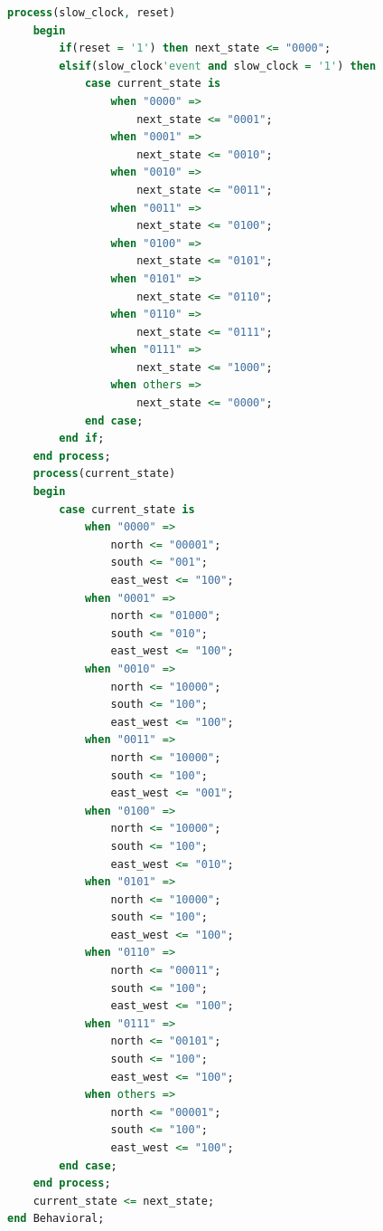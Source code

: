 \documentclass[11pt]{article}
\begin{document}
\begin{appendices}
\begin{lstlisting}[language=VHDL]
    process(slow_clock, reset)
    begin
        if(reset = '1') then next_state <= "0000";
        elsif(slow_clock'event and slow_clock = '1') then
            case current_state is
                when "0000" =>
                    next_state <= "0001";
                when "0001" =>
                    next_state <= "0010";
                when "0010" =>
                    next_state <= "0011";
                when "0011" =>
                    next_state <= "0100";
                when "0100" =>
                    next_state <= "0101";
                when "0101" =>
                    next_state <= "0110";
                when "0110" =>
                    next_state <= "0111";
                when "0111" =>
                    next_state <= "1000";
                when others =>
                    next_state <= "0000";
            end case;
        end if;
    end process;
    process(current_state)
    begin
        case current_state is
            when "0000" =>
                north <= "00001";
                south <= "001";
                east_west <= "100";
            when "0001" =>
                north <= "01000";
                south <= "010";
                east_west <= "100";
            when "0010" =>
                north <= "10000";
                south <= "100";
                east_west <= "100";
            when "0011" =>
                north <= "10000";
                south <= "100";
                east_west <= "001";
            when "0100" =>
                north <= "10000";
                south <= "100";
                east_west <= "010";
            when "0101" =>
                north <= "10000";
                south <= "100";
                east_west <= "100";
            when "0110" =>
                north <= "00011";
                south <= "100";
                east_west <= "100";
            when "0111" =>
                north <= "00101";
                south <= "100";
                east_west <= "100";
            when others =>
                north <= "00001";
                south <= "100";
                east_west <= "100";
        end case;
    end process;
    current_state <= next_state;
end Behavioral;
\end{lstlisting}


\end{appendices}
\end{document}
